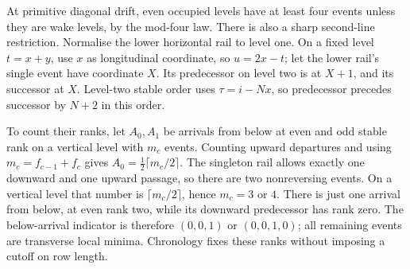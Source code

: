 \documentclass[11pt,letterpaper]{article}
\begin{document}
At primitive diagonal drift, even occupied levels have at least four
events unless they are wake levels, by the mod-four law. There is also
a sharp second-line restriction. Normalise the lower horizontal rail
to level one. On a fixed level $t=x+y$, use $x$ as longitudinal
coordinate, so $u=2x-t$; let the lower rail's single event have coordinate $X$.
Its predecessor on level two is at $X+1$, and its successor at $X$.
Level-two stable order uses $\tau=i-Nx$, so predecessor precedes
successor by $N+2$ in this order.

To count their ranks, let $A_0,A_1$ be arrivals from below at even
and odd stable rank on a vertical level with $m_c$ events. Counting
upward departures and using $m_c=f_{c-1}+f_c$ gives
$A_0=\tfrac12\lceil m_c/2\rceil$.
The singleton rail allows exactly one downward and one upward passage,
so there are two nonreversing events. On a vertical level that number
is $\lceil m_c/2\rceil$, hence $m_c=3$ or $4$.
There is just one arrival from below, at even rank two, while its
downward predecessor has rank zero. The below-arrival indicator is
therefore $(0,0,1)$ or $(0,0,1,0)$; all remaining events are
transverse local minima. Chronology fixes these ranks without imposing a cutoff on row length.
\end{document}
